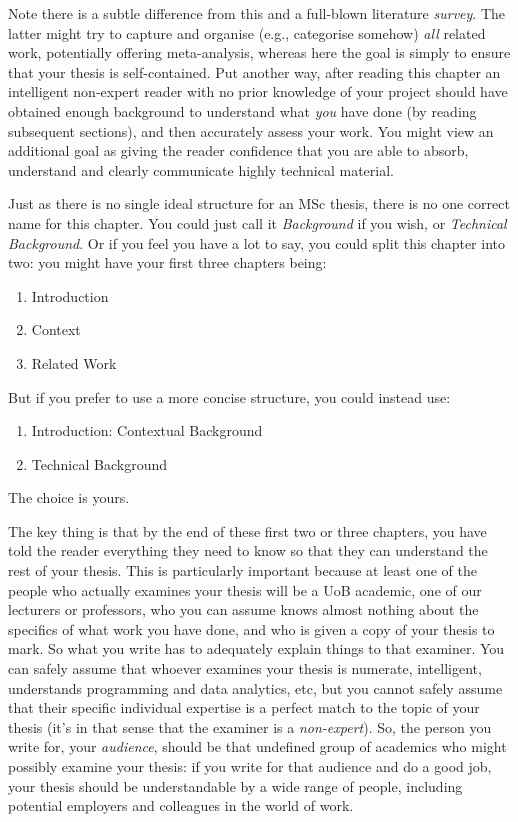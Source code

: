 \documentclass[ %
                    author={Revalda Putawara},
                supervisor={Dr. James Pope},
                    degree={MSc},
                     title={Robustness of Bayesian Neural Networks Design Choices Against Weight and Bias Perturbation Induced by Single Event Upsets (SEUs)},
                      type={},
                      year={2025}]{dissertation}
\begin{document}
Note there is a subtle difference from
this and a full-blown literature {\em survey}.  The latter might try
to capture and organise (e.g., categorise somehow) {\em all}\/ related work,
potentially offering meta-analysis, whereas here the goal is simply to
ensure that your thesis is self-contained.  Put another way, after reading 
this chapter an intelligent non-expert reader with no prior knowledge of your project should have obtained enough background to 
understand what {\em you}\/ have done (by reading subsequent sections), and then 
accurately assess your work.  You might view an additional goal as giving 
the reader confidence that you are able to absorb, understand and clearly 
communicate highly technical material.

Just as there is no single ideal structure for an MSc thesis, there is no one correct name for this chapter. You could just call it {\em Background}\/ if you wish, or {\em Technical Background}. Or if you feel you have a lot to say, you could split this chapter into two: you might have your first three chapters being:
\begin{enumerate}
\item Introduction
\item Context
\item Related Work
\end{enumerate}
\noindent
But if you prefer to use a more concise structure, you could instead use:
\begin{enumerate}
\item Introduction: Contextual Background
\item Technical Background
\end{enumerate}
\noindent
The choice is yours. 

The key thing is that by the end of these first two or three chapters, you have told the reader everything they need to know so that they can understand the rest of your thesis. This is particularly important because at least one of the people who actually examines your thesis will be a UoB academic, one of our lecturers or professors, who you can assume knows almost nothing about the specifics of what work you have done, and who is given a copy of your thesis to mark. So what you write has to adequately explain things to that examiner. You can safely assume that whoever examines your thesis is numerate, intelligent, understands programming and data analytics, etc, but you cannot safely assume that their specific individual expertise is a perfect match to the topic of your thesis (it's in that sense that the examiner is a {\em non-expert}). So, the person you write for, your {\em audience}, should be that undefined group of academics who might possibly examine your thesis: if you write for that audience and do a good job, your thesis should be understandable by a wide range of people, including potential employers and colleagues in the world of work.
\fi
\end{document}
